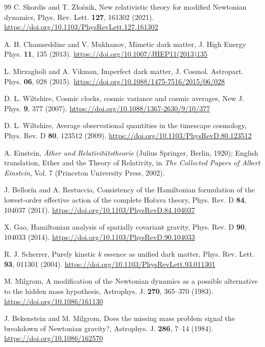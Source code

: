 \documentclass[aps,prd,reprint,onecolumn,notitlepage,nofootinbib,longbibliography,floatfix]{revtex4-2}
\theoremstyle{scstyle}
\theoremstyle{definition}
\theoremstyle{remark}
\begin{document}
\begin{thebibliography}{99}
C. Skordis and T. Z\l{}o\'snik, New relativistic theory for modified Newtonian dynamics, Phys. Rev. Lett. \textbf{127}, 161302 (2021). \url{https://doi.org/10.1103/PhysRevLett.127.161302}

A. H. Chamseddine and V. Mukhanov, Mimetic dark matter, J. High Energy Phys. \textbf{11}, 135 (2013). \url{https://doi.org/10.1007/JHEP11(2013)135}

L. Mirzagholi and A. Vikman, Imperfect dark matter, J. Cosmol. Astropart. Phys. \textbf{06}, 028 (2015). \url{https://doi.org/10.1088/1475-7516/2015/06/028}

D. L. Wiltshire, Cosmic clocks, cosmic variance and cosmic averages, New J. Phys. \textbf{9}, 377 (2007). \url{https://doi.org/10.1088/1367-2630/9/10/377}

D. L. Wiltshire, Average observational quantities in the timescape cosmology, Phys. Rev. D \textbf{80}, 123512 (2009). \url{https://doi.org/10.1103/PhysRevD.80.123512}

A. Einstein, \emph{\"Ather und Relativit\"atstheorie} (Julius Springer, Berlin, 1920); English translation, Ether and the Theory of Relativity, in \emph{The Collected Papers of Albert Einstein}, Vol. 7 (Princeton University Press, 2002).

J. Bellor\'in and A. Restuccia, Consistency of the Hamiltonian formulation of the lowest-order effective action of the complete Ho\v{r}ava theory, Phys. Rev. D \textbf{84}, 104037 (2011). \url{https://doi.org/10.1103/PhysRevD.84.104037}

X. Gao, Hamiltonian analysis of spatially covariant gravity, Phys. Rev. D \textbf{90}, 104033 (2014). \url{https://doi.org/10.1103/PhysRevD.90.104033}

R. J. Scherrer, Purely kinetic $k$ essence as unified dark matter, Phys. Rev. Lett. \textbf{93}, 011301 (2004). \url{https://doi.org/10.1103/PhysRevLett.93.011301}

M. Milgrom, A modification of the Newtonian dynamics as a possible alternative to the hidden mass hypothesis, Astrophys. J. \textbf{270}, 365--370 (1983). \url{https://doi.org/10.1086/161130}

J. Bekenstein and M. Milgrom, Does the missing mass problem signal the breakdown of Newtonian gravity?, Astrophys. J. \textbf{286}, 7--14 (1984). \url{https://doi.org/10.1086/162570}


\end{thebibliography}
\end{document}
